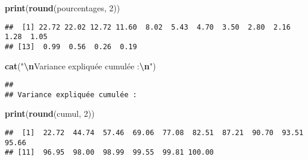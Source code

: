 \documentclass[
]{article}
\newenvironment{Shaded}{\begin{snugshade}}{\end{snugshade}}
\newcommand{\DecValTok}[1]{\textcolor[rgb]{0.00,0.00,0.81}{#1}}
\newcommand{\FunctionTok}[1]{\textcolor[rgb]{0.13,0.29,0.53}{\textbf{#1}}}
\newcommand{\NormalTok}[1]{#1}
\newcommand{\SpecialCharTok}[1]{\textcolor[rgb]{0.81,0.36,0.00}{\textbf{#1}}}
\newcommand{\StringTok}[1]{\textcolor[rgb]{0.31,0.60,0.02}{#1}}
\begin{document}
\begin{Shaded}
\begin{Highlighting}[]
\FunctionTok{print}\NormalTok{(}\FunctionTok{round}\NormalTok{(pourcentages, }\DecValTok{2}\NormalTok{))}
\end{Highlighting}
\end{Shaded}

\begin{verbatim}
##  [1] 22.72 22.02 12.72 11.60  8.02  5.43  4.70  3.50  2.80  2.16  1.28  1.05
## [13]  0.99  0.56  0.26  0.19
\end{verbatim}

\begin{Shaded}
\begin{Highlighting}[]
\FunctionTok{cat}\NormalTok{(}\StringTok{"}\SpecialCharTok{\textbackslash{}n}\StringTok{Variance expliquée cumulée :}\SpecialCharTok{\textbackslash{}n}\StringTok{"}\NormalTok{)}
\end{Highlighting}
\end{Shaded}

\begin{verbatim}
## 
## Variance expliquée cumulée :
\end{verbatim}

\begin{Shaded}
\begin{Highlighting}[]
\FunctionTok{print}\NormalTok{(}\FunctionTok{round}\NormalTok{(cumul, }\DecValTok{2}\NormalTok{))}
\end{Highlighting}
\end{Shaded}

\begin{verbatim}
##  [1]  22.72  44.74  57.46  69.06  77.08  82.51  87.21  90.70  93.51  95.66
## [11]  96.95  98.00  98.99  99.55  99.81 100.00
\end{verbatim}
\end{document}
